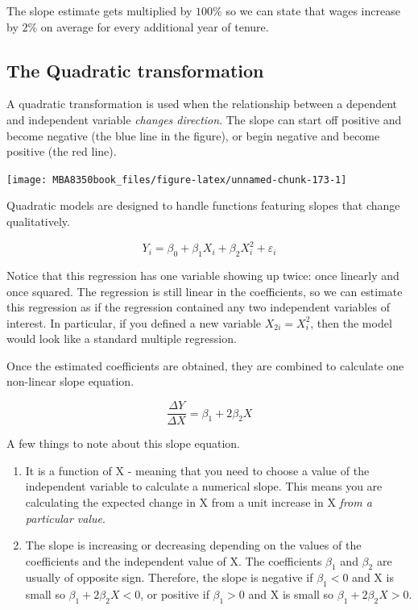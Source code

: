 \documentclass[
]{book}
\begin{document}
The slope estimate gets multiplied by \(100\%\) so we can state that wages increase by \(2\%\) on average for every additional year of tenure.

\hypertarget{the-quadratic-transformation}{%
\subsection{The Quadratic transformation}\label{the-quadratic-transformation}}

A quadratic transformation is used when the relationship between a dependent and independent variable \emph{changes direction}. The slope can start off positive and become negative (the blue line in the figure), or begin negative and become positive (the red line).

\begin{center}\texttt{[image: MBA8350book\_files/figure-latex/unnamed-chunk-173-1]} \end{center}

Quadratic models are designed to handle functions featuring slopes that change qualitatively.

\[Y_i = \beta_0 + \beta_1 X_i + \beta_2 X_i^2 + \varepsilon_i\]

Notice that this regression has one variable showing up twice: once linearly and once squared. The regression is still linear in the coefficients, so we can estimate this regression as if the regression contained any two independent variables of interest. In particular, if you defined a new variable \(X_{2i} = X_i^2\), then the model would look like a standard multiple regression.

Once the estimated coefficients are obtained, they are combined to calculate one non-linear slope equation.

\[\frac{\Delta Y}{\Delta X} = \beta_1 + 2\beta_2  X\]

A few things to note about this slope equation.

\begin{enumerate}
\def\labelenumi{\arabic{enumi}.}
\item
  It is a function of X - meaning that you need to choose a value of the independent variable to calculate a numerical slope. This means you are calculating the expected change in X from a unit increase in X \emph{from a particular value}.
\item
  The slope is increasing or decreasing depending on the values of the coefficients and the independent value of X. The coefficients \(\beta_1\) and \(\beta_2\) are usually of opposite sign. Therefore, the slope is negative if \(\beta_1<0\) and X is small so \(\beta_1 + 2\beta_2 X<0\), or positive if \(\beta_1>0\) and X is small so \(\beta_1 + 2\beta_2 X>0\).
\end{enumerate}
\end{document}

